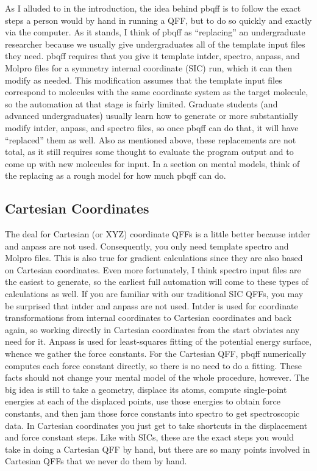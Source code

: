\documentclass{article}
\begin{document}
As I alluded to in the introduction, the idea behind pbqff is to
follow the exact steps a person would by hand in running a QFF, but to
do so quickly and exactly via the computer. As it stands, I think of
pbqff as ``replacing'' an undergraduate researcher because we usually
give undergraduates all of the template input files they need. pbqff
requires that you give it template intder, spectro, anpass, and Molpro
files for a symmetry internal coordinate (SIC) run, which it can then
modify as needed. This modification assumes that the template input
files correspond to molecules with the same coordinate system as the
target molecule, so the automation at that stage is fairly
limited. Graduate students (and advanced undergraduates) usually learn
how to generate or more substantially modify intder, anpass, and
spectro files, so once pbqff can do that, it will have ``replaced''
them as well. Also as mentioned above, these replacements are not
total, as it still requires some thought to evaluate the program
output and to come up with new molecules for input. In a section on
mental models, think of the replacing as a rough model for how much
pbqff can do.

\subsection{Cartesian Coordinates}

The deal for Cartesian (or XYZ) coordinate QFFs is a little better
because intder and anpass are not used. Consequently, you only need
template spectro and Molpro files. This is also true for gradient
calculations since they are also based on Cartesian coordinates. Even
more fortunately, I think spectro input files are the easiest to
generate, so the earliest full automation will come to these types of
calculations as well. If you are familiar with our traditional SIC
QFFs, you may be surprised that intder and anpass are not used. Intder
is used for coordinate transformations from internal coordinates to
Cartesian coordinates and back again, so working directly in Cartesian
coordinates from the start obviates any need for it. Anpass is used
for least-squares fitting of the potential energy surface, whence we
gather the force constants. For the Cartesian QFF, pbqff numerically
computes each force constant directly, so there is no need to do a
fitting. These facts should not change your mental model of the whole
procedure, however. The big idea is still to take a geometry, displace
its atoms, compute single-point energies at each of the displaced
points, use those energies to obtain force constants, and then jam
those force constants into spectro to get spectroscopic data. In
Cartesian coordinates you just get to take shortcuts in the
displacement and force constant steps. Like with SICs, these are the
exact steps you would take in doing a Cartesian QFF by hand, but there
are so many points involved in Cartesian QFFs that we never do them by
hand.
\end{document}
